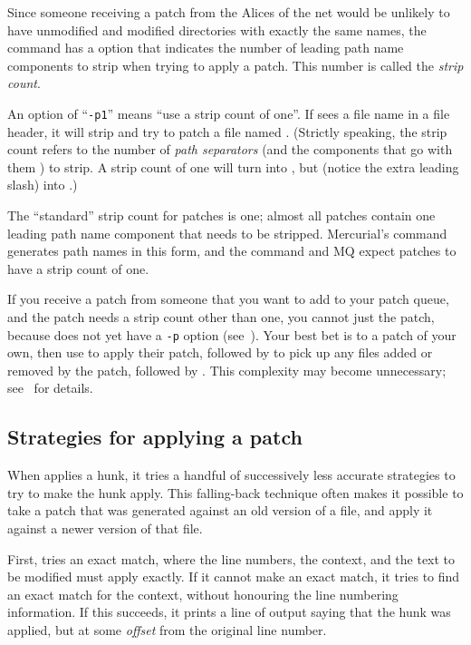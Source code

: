 Since someone receiving a patch from the Alices of the net would be
unlikely to have unmodified and modified directories with exactly the
same names, the  command has a 
option that indicates the number of leading path name components to
strip when trying to apply a patch.  This number is called the
\emph{strip count}.

An option of ``\texttt{-p1}'' means ``use a strip count of one''.  If
 sees a file name  in a file
header, it will strip  and try to patch a file named
.  (Strictly speaking, the strip count refers to the
number of \emph{path separators} (and the components that go with them
) to strip.  A strip count of one will turn  into
, but  (notice the extra leading
slash) into .)

The ``standard'' strip count for patches is one; almost all patches
contain one leading path name component that needs to be stripped.
Mercurial's  command generates path names in this form,
and the  command and MQ expect patches to have a strip
count of one.

If you receive a patch from someone that you want to add to your patch
queue, and the patch needs a strip count other than one, you cannot
just  the patch, because  does not yet
have a \texttt{-p} option (see~).  Your best bet is to
 a patch of your own, then use 
to apply their patch, followed by  to pick up any
files added or removed by the patch, followed by .
This complexity may become unnecessary; see~ for details.
\subsection{Strategies for applying a patch}

When  applies a hunk, it tries a handful of
successively less accurate strategies to try to make the hunk apply.
This falling-back technique often makes it possible to take a patch
that was generated against an old version of a file, and apply it
against a newer version of that file.

First,  tries an exact match, where the line numbers,
the context, and the text to be modified must apply exactly.  If it
cannot make an exact match, it tries to find an exact match for the
context, without honouring the line numbering information.  If this
succeeds, it prints a line of output saying that the hunk was applied,
but at some \emph{offset} from the original line number.

